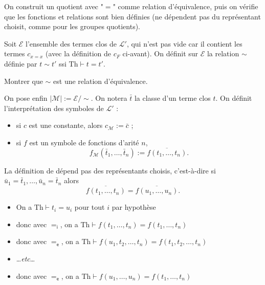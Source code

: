 \documentclass[./main]{subfiles}
\begin{document}
  On construit un quotient avec "$=$" comme relation d'équivalence, puis on vérifie que les fonctions et relations sont bien définies (ne dépendent pas du représentant choisit, comme pour les groupes quotients).

  Soit $\mathcal{E}$ l'ensemble des termes clos de $\mathcal{L}'$, qui n'est pas vide car il contient les termes $c_{x = x}$ (avec la définition de $c_F$ ci-avant).
  On définit sur $\mathcal{E}$ la relation $\sim$ définie par $t \sim t'$ ssi $\mathrm{Th} \vdash t = t'$.

  \begin{exo}
    Montrer que $\sim$ est une relation d'équivalence.
  \end{exo}

  On pose enfin $|\mathcal{M}| := \mathcal{E} / {\sim}$.
  On notera $\bar{t}$ la classe d'un terme clos $t$.
  On définit l'interprétation des symboles de $\mathcal{L}'$ :
  \begin{itemize}
    \item si $c$ est une constante, alors $c_{\mathcal{M}} := \bar{c}$ ;
    \item si $f$ est un symbole de fonctions d'arité $n$, \[
        f_{\mathcal{M}}(\bar{t}_1, \ldots, \bar{t}_n) := \overline{f(t_1, \ldots, t_n)}
      .\]
  \end{itemize}

  \begin{lem}
    La définition de dépend pas des représentants choisis, c'est-à-dire 
    si $\bar{u}_1 = \bar{t}_1, \ldots, \bar{u}_n = \bar{t}_n$ alors \[
      \overline{f(t_1, \ldots, t_n)} = \overline{f(u_1, \ldots, u_n)}
    .\] 
  \end{lem}
  \begin{prv}
    \begin{itemize}
      \item On a $\mathrm{Th} \vdash t_i = u_i$ pour tout $i$ par hypothèse
      \item donc avec $=_\mathsf{i}$, on a $\mathrm{Th} \vdash f(t_1, \ldots, t_n) = f(t_1, \ldots, t_n)$
      \item donc avec $=_\mathsf{e}$, on a $\mathrm{Th} \vdash f(u_1, t_2, \ldots, t_n) = f(t_1, t_2, \ldots, t_n)$
      \item \ldots\textit{etc}\ldots
      \item donc avec $=_\mathsf{e}$, on a $\mathrm{Th} \vdash f(u_1, \ldots, u_n) = f(t_1, \ldots, t_n)$
    \end{itemize}
  \end{prv}
\end{document}
